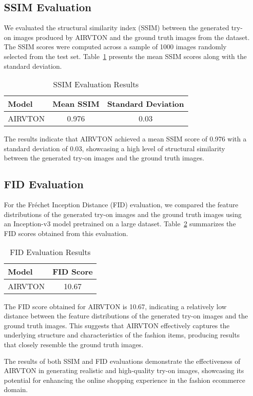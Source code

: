 \subsection{SSIM Evaluation}

We evaluated the structural similarity index (SSIM) between the generated try-on images produced by AIRVTON and the ground truth images from the dataset. The SSIM scores were computed across a sample of 1000 images randomly selected from the test set. Table~\ref{tab:ssim_results} presents the mean SSIM scores along with the standard deviation.


\begin{table}[htbp]
  \caption{SSIM Evaluation Results}
  \label{tab:ssim_results}
  \centering
  \begin{tabular}{lcc}
    \toprule
    \textbf{Model} & \textbf{Mean SSIM} & \textbf{Standard Deviation} \\
    \midrule
    AIRVTON & 0.976 & 0.03 \\
    \bottomrule
  \end{tabular}
\end{table}

The results indicate that AIRVTON achieved a mean SSIM score of 0.976 with a standard deviation of 0.03, showcasing a high level of structural similarity between the generated try-on images and the ground truth images.

\subsection{FID Evaluation}

For the Fréchet Inception Distance (FID) evaluation, we compared the feature distributions of the generated try-on images and the ground truth images using an Inception-v3 model pretrained on a large dataset. Table~\ref{tab:fid_results} summarizes the FID scores obtained from this evaluation.

\begin{table}[htbp]
  \caption{FID Evaluation Results}
  \label{tab:fid_results}
  \centering
  \begin{tabular}{lc}
    \toprule
    \textbf{Model} & \textbf{FID Score} \\
    \midrule
    AIRVTON & 10.67 \\
    \bottomrule
  \end{tabular}
\end{table}

The FID score obtained for AIRVTON is 10.67, indicating a relatively low distance between the feature distributions of the generated try-on images and the ground truth images. This suggests that AIRVTON effectively captures the underlying structure and characteristics of the fashion items, producing results that closely resemble the ground truth images.

The results of both SSIM and FID evaluations demonstrate the effectiveness of AIRVTON in generating realistic and high-quality try-on images, showcasing its potential for enhancing the online shopping experience in the fashion ecommerce domain.
